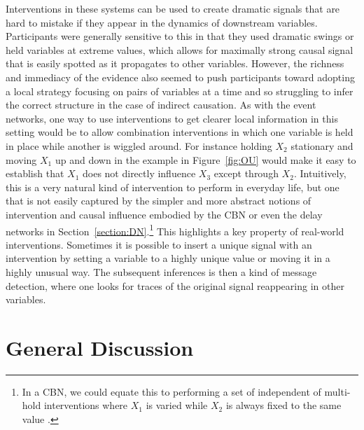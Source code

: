 \documentclass{cambridge7A}%
\begin{document}
Interventions in these systems can be used to create dramatic signals that are hard to mistake if they appear in the dynamics of downstream variables.  Participants were generally sensitive to this in that they used dramatic swings or held variables at extreme values, which allows for maximally strong causal signal that is easily spotted as it propagates to other variables.  However, the richness and immediacy of the evidence also seemed to push participants toward adopting a local strategy focusing on pairs of variables at a time and so struggling to infer the correct structure in the case of indirect causation.  As with the event networks, one way to use interventions to get clearer local information in this setting would be to allow combination interventions in which one variable is held in place while another is wiggled around.  For instance holding $X_2$ stationary and moving $X_1$ up and down in the example in Figure~\ref{fig:OU} would make it easy to establish that $X_1$ does not directly influence $X_3$ except through $X_2$.  Intuitively, this is a very natural kind of intervention to perform in everyday life, but one that is not easily captured by the simpler and more abstract notions of intervention and causal influence embodied by the CBN or even the delay networks in Section~\ref{section:DN}.\footnote{In a CBN, we could equate this to performing a set of independent of multi-hold interventions where $X_1$  is varied while $X_2$ is always fixed to the same value \citep{woodward2003making}.}  
This highlights a key property of real-world interventions.  Sometimes it is possible to insert a unique signal with an intervention by setting a variable to a highly unique value or moving it in a highly unusual way.  The subsequent inferences is then a kind of message detection, where one looks for traces of the original signal reappearing in other variables.

\section{General Discussion}
\end{document}

